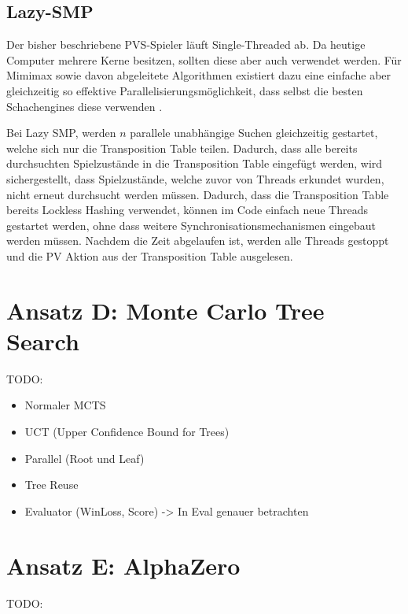 \pagebreak

\subsection{Lazy-SMP}

Der bisher beschriebene \ac{PVS}-Spieler läuft Single-Threaded ab. Da heutige Computer mehrere Kerne besitzen, sollten diese aber auch verwendet werden. Für Mimimax sowie davon abgeleitete Algorithmen existiert dazu eine einfache aber gleichzeitig so effektive Parallelisierungsmöglichkeit, dass selbst die besten Schachengines diese verwenden \cite{2016.Stockfish7} \cite[S. ]{2016.ParallelChessEngine}.

Bei Lazy \ac{SMP}, werden $n$ parallele unabhängige Suchen gleichzeitig gestartet, welche sich nur die Transposition Table teilen. Dadurch, dass alle bereits durchsuchten Spielzustände in die Transposition Table eingefügt werden, wird sichergestellt, dass Spielzustände, welche zuvor von Threads erkundet wurden, nicht erneut durchsucht werden müssen. Dadurch, dass die Transposition Table bereits Lockless Hashing verwendet, können im Code einfach neue Threads gestartet werden, ohne dass weitere Synchronisationsmechanismen eingebaut werden müssen. Nachdem die Zeit abgelaufen ist, werden alle Threads gestoppt und die \ac{PV} Aktion aus der Transposition Table ausgelesen.

\section{Ansatz D: Monte Carlo Tree Search}
\label{section:erstellung-ansatz-c}

TODO:

\begin{itemize}
    \item Normaler MCTS
    \item UCT (Upper Confidence Bound for Trees)
    \item Parallel (Root und Leaf)
    \item Tree Reuse
    \item Evaluator (WinLoss, Score) -> In Eval genauer betrachten
\end{itemize}

\section{Ansatz E: AlphaZero}
\label{section:erstellung-ansatz-d}

TODO:

